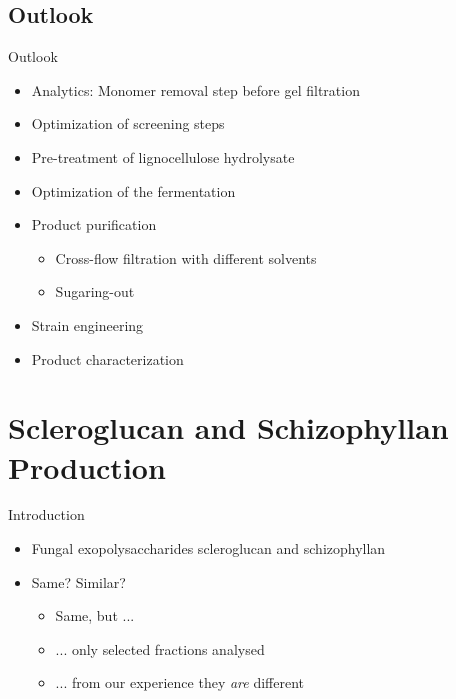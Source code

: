 \documentclass[mathserif]{beamer}
\newcommand{\lch}{lignocellulose hydrolysate}
\newcommand{\eps}{exopolysaccharide}
\newcommand{\SCL}{Scleroglucan}
\newcommand{\scl}{scleroglucan}
\newcommand{\SHZ}{Schizophyllan}
\newcommand{\shz}{schizophyllan}
\begin{document}
\subsection{Outlook}

\begin{frame}{Outlook}{}
	\begin{itemize}
		\item Analytics: Monomer removal step before gel filtration
		\pause
		\item Optimization of screening steps
		\pause
		\item Pre-treatment of \lch{}
		\pause
		\item Optimization of the fermentation
		\pause
		\item Product purification
		\pause
			\begin{itemize}
				\item Cross-flow filtration with different solvents
				\pause
				\item Sugaring-out
			\end{itemize}
		\pause
		\item Strain engineering
		\pause
		\item Product characterization
	\end{itemize}
\end{frame}

\section{\SCL{} and \SHZ{} Production}

\begin{frame}{Introduction}{}
	\begin{itemize}
		\item Fungal \eps{}s \scl{} and \shz{}
		\pause
		\item Same? Similar?
		\pause
			\begin{itemize}
				\item Same, but ...
				\pause
				\item ... only selected fractions analysed
				\pause
				\item ... from our experience they \textit{are} different
			\end{itemize}
	\end{itemize}
\end{frame}
\end{document}
